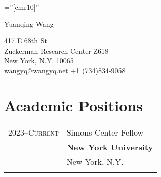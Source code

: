 \documentclass[letterpaper,10pt]{article}
\begin{document}

\pagestyle{empty} %

\font\fb=''[cmr10]'' %

\par{\centering
		{ \Huge  Yuanqing Wang
	}\bigskip\par}

\begin{center}

417 E 68th St\\
Zuckerman Research Center Z618\\
New York, N.Y. 10065\\
\href{mailto:wangyq@wangyq.net}{wangyq@wangyq.net} +1 (734)834-9058\\
\end{center}

\section{Academic Positions}
\begin{longtable}{p{} p{} }
\textsc{2023--Current} & Simons Center Fellow \\
& \textbf{New York University} \\
& New York, N.Y. \\\\
\end{longtable}

\end{document}
